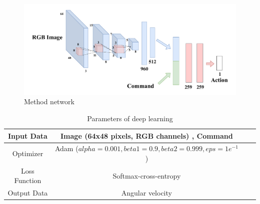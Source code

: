 \begin{figure}[h]
    \centering
    \includegraphics[width = 13cm]{./figs/network.pdf}
    \caption{Method network}
    \label{fig::methodnetwork}
\end{figure}
\begin{table}[h]
    \centering
    \caption{Parameters of deep learning}
    \begin{tabular}{|c|c|c|c|}
    \hline
    Input Data    & Image (64x48 pixels, RGB channels) , Command                                              \\ \hline
    Optimizer     & Adam ($alpha = 0.001, beta1 = 0.9, beta2 = 0.999, eps = 1e^{-1}$ )  \\ \hline
    Loss Function & Softmax-cross-entropy                                                            \\ \hline
    Output Data   & Angular velocity                                              \\ \hline
    \end{tabular}
    \label{tb::param}
    \end{table}
\newpage




